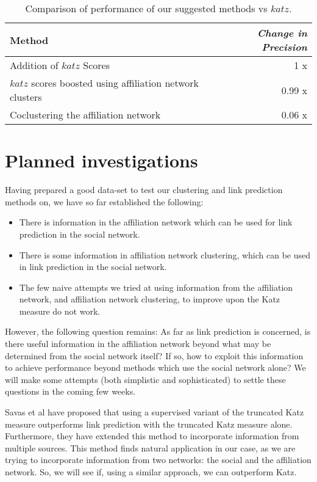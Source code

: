 \documentclass{report}
\begin{document}
\begin{table}
\centering
\begin{tabular}{| p{5cm} |  r |}
\hline
 Method & \textit{Change in Precision}\\[1ex]
\hline
 Addition of $katz$ Scores & 1 x\\
\hline
 $katz$ scores boosted using affiliation network clusters& 0.99 x\\
\hline
 Coclustering the affiliation network & 0.06 x \\
\hline
\end{tabular}
\caption{Comparison of performance of our suggested methods vs $katz$.}
\label{tab:methods}
\end{table} 


\chapter{Planned investigations}
Having prepared a good data-set to test our clustering and link prediction methods on, we have so far established the following:
\begin{itemize}
 \item There is information in the affiliation network which can be used for link prediction in the social network.
 \item There is some information in affiliation network clustering, which can be used in link prediction in the social network.
 \item The few naive attempts we tried at using information from the affiliation network, and affiliation network clustering, to improve upon the Katz measure do not work.
\end{itemize}

However, the following question remains: As far as link prediction is concerned, is there useful information in the affiliation network beyond what may be determined from the social network itself? If so, how to exploit this information to achieve performance beyond methods which use the social network alone? We will make some attempts (both simplistic and sophisticated) to settle these questions in the coming few weeks.

Savas et al\cite{savasLinkPred} have proposed that using a supervised variant of the truncated Katz measure outperforms link prediction with the truncated Katz measure alone. Furthermore, they have extended this method to incorporate information from multiple sources. This method finds natural application in our case, as we are trying to incorporate information from two networks: the social and the affiliation network. So, we will see if, using a similar approach, we can outperform Katz.
\end{document}
